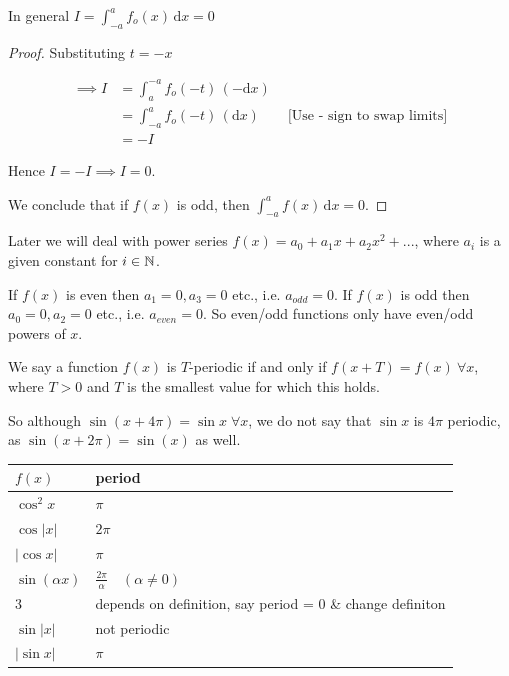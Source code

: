 \documentclass[10pt]{scrartcl}
\begin{document}
\begin{proposition} In general $I = \displaystyle{\boxed{\int_{-a}^{a} f_o(x) \, \mathrm{d}x = 0}}$\end{proposition}

\begin{proof}Substituting $t = -x$

\begin{align*}\nonumber
 \implies I &= \int_{a}^{-a} f_o(-t) \, (\mathrm{-d}x) \\
 &=  \int_{-a}^{a} f_o(-t) \, (\mathrm{d}x) \qquad \text{[Use - sign to swap limits]}\\
 &=  -I 
\end{align*}

Hence $I = -I \implies I = 0$. 

We conclude that if $f(x)$ is odd, then $ \displaystyle{\int_{-a}^{a} f(x) \, \mathrm{d}x = 0}.$\end{proof}

Later we will deal with power series $f(x) = a_0 + a_1x + a_2x^2 + ...$, where $a_i$ is a given constant  for $i \in \mathbb{N}$. 

If $f(x)$ is even then $a_1 = 0, a_3 = 0$ etc., i.e. $a_{odd} = 0$. If $f(x)$ is odd then $a_0 = 0, a_2 = 0$ etc., i.e. $a_{even} = 0$. So even/odd functions only have even/odd powers of $x$.\\


\vspace*{5pt}
\begin{definition} 
We say a function $f(x)$ is $T$-periodic if and only if $f(x + T) = f(x)~ \forall x$, where $T >0 $ and $T$ is the smallest value for which this holds.
\end{definition}


So although $\sin (x+ 4\pi) = \sin x \; \forall x$, we do not say that $\sin x$ is $4\pi$ periodic, as $\sin (x + 2\pi) = \sin (x) $ as well.\\

\bgroup
\def\arraystretch{1.5}
\begin{table}[H]
    \begin{tabular}{l|l}
    \hline
    $f(x)$            & period                                                    \\ \hline
    $\cos^2x$         & $\pi$                                                     \\
    $\cos |x|$        & $2\pi$                                                    \\
    $|\cos x|$        & $\pi$                                                     \\
    $\sin (\alpha x)$ & $\frac{2\pi}{\alpha} \quad (\alpha \neq 0)$               \\
    $3$                 & depends on definition, say period = 0 \& change definiton \\
    $\sin |x|$        & not periodic                                              \\
    $| \sin x|$       & $\pi$                                                     \\
    \end{tabular}
\end{table}
\egroup
\end{document}
